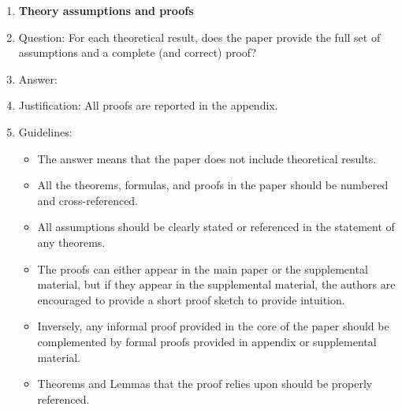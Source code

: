\documentclass{article}
\numberwithin{theorem}{section}
\theoremstyle{definition}
\begin{document}
\begin{enumerate}
\item {\bf Theory assumptions and proofs}
    \item[] Question: For each theoretical result, does the paper provide the full set of assumptions and a complete (and correct) proof?
    \item[] Answer: \answerYes{} %
    \item[] Justification: All proofs are reported in the appendix.
    \item[] Guidelines:
    \begin{itemize}
        \item The answer \answerNA{} means that the paper does not include theoretical results. 
        \item All the theorems, formulas, and proofs in the paper should be numbered and cross-referenced.
        \item All assumptions should be clearly stated or referenced in the statement of any theorems.
        \item The proofs can either appear in the main paper or the supplemental material, but if they appear in the supplemental material, the authors are encouraged to provide a short proof sketch to provide intuition. 
        \item Inversely, any informal proof provided in the core of the paper should be complemented by formal proofs provided in appendix or supplemental material.
        \item Theorems and Lemmas that the proof relies upon should be properly referenced. 
    \end{itemize}


\end{enumerate}
\end{document}

